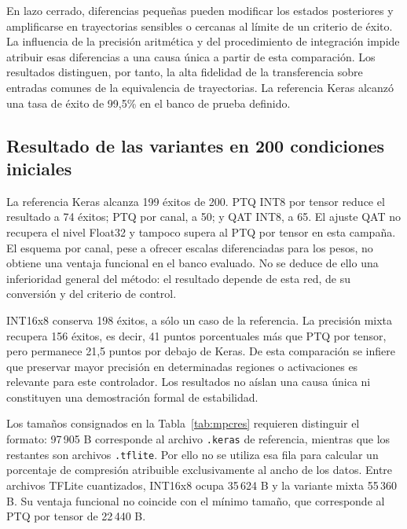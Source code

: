 En lazo cerrado, diferencias pequeñas pueden modificar los estados posteriores y amplificarse en trayectorias sensibles o cercanas al límite de un criterio de éxito. La influencia de la precisión aritmética y del procedimiento de integración impide atribuir esas diferencias a una causa única a partir de esta comparación. Los resultados distinguen, por tanto, la alta fidelidad de la transferencia sobre entradas comunes de la equivalencia de trayectorias. La referencia Keras alcanzó una tasa de éxito de 99,5\% en el banco de prueba definido.
\FloatBarrier
\subsection{Resultado de las variantes en 200 condiciones iniciales}


La referencia Keras alcanza 199 éxitos de 200. PTQ INT8 por tensor reduce el resultado a 74 éxitos; PTQ por canal, a 50; y QAT INT8, a 65. El ajuste QAT no recupera el nivel Float32 y tampoco supera al PTQ por tensor en esta campaña. El esquema por canal, pese a ofrecer escalas diferenciadas para los pesos, no obtiene una ventaja funcional en el banco evaluado. No se deduce de ello una inferioridad general del método: el resultado depende de esta red, de su conversión y del criterio de control.

INT16x8 conserva 198 éxitos, a sólo un caso de la referencia. La precisión mixta recupera 156 éxitos, es decir, 41 puntos porcentuales más que PTQ por tensor, pero permanece 21,5 puntos por debajo de Keras. De esta comparación se infiere que preservar mayor precisión en determinadas regiones o activaciones es relevante para este controlador. Los resultados no aíslan una causa única ni constituyen una demostración formal de estabilidad.

Los tamaños consignados en la Tabla~\ref{tab:mpcres} requieren distinguir el formato: 97\,905 B corresponde al archivo \texttt{.keras} de referencia, mientras que los restantes son archivos \texttt{.tflite}. Por ello no se utiliza esa fila para calcular un porcentaje de compresión atribuible exclusivamente al ancho de los datos. Entre archivos TFLite cuantizados, INT16x8 ocupa 35\,624 B y la variante mixta 55\,360 B. Su ventaja funcional no coincide con el mínimo tamaño, que corresponde al PTQ por tensor de 22\,440 B.

